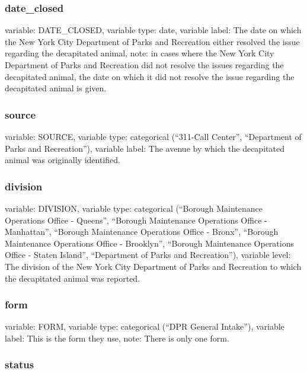 \documentclass[]{article}
\begin{document}
\subsubsection{date\_closed}\label{dateux5fclosed}

variable: DATE\_CLOSED, variable type: date, variable label: The date on
which the New York City Department of Parks and Recreation either
resolved the issue regarding the decapitated animal, note: in cases
where the New York City Department of Parks and Recreation did not
resolve the issues regarding the decapitated animal, the date on which
it did not resolve the issue regarding the decapitated animal is given.

\subsubsection{source}\label{source}

variable: SOURCE, variable type: categorical (``311-Call Center'',
``Department of Parks and Recreation''), variable label: The avenue by
which the decapitated animal was originally identified.

\subsubsection{division}\label{division}

variable: DIVISION, variable type: categorical (``Borough Maintenance
Operations Office - Queens'', ``Borough Maintenance Operations Office -
Manhattan'', ``Borough Maintenance Operations Office - Bronx'',
``Borough Maintenance Operations Office - Brooklyn'', ``Borough
Maintenance Operations Office - Staten Island'', ``Department of Parks
and Recreation''), variable level: The division of the New York City
Department of Parks and Recreation to which the decapitated animal was
reported.

\subsubsection{form}\label{form}

variable: FORM, variable type: categorical (``DPR General Intake''),
variable label: This is the form they use, note: There is only one form.

\subsubsection{status}\label{status}
\end{document}
